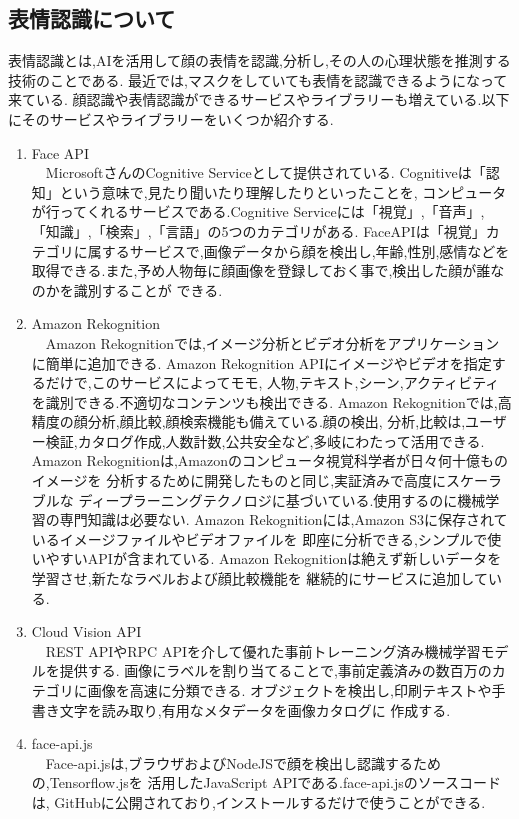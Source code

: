 \subsection{表情認識について}
表情認識とは,AIを活用して顔の表情を認識,分析し,その人の心理状態を推測する技術のことである.
最近では,マスクをしていても表情を認識できるようになって来ている.
顔認識や表情認識ができるサービスやライブラリーも増えている.以下にそのサービスやライブラリーをいくつか紹介する.

\renewcommand{\labelenumi}{(\arabic{enumi})}

\begin{enumerate}
  \item Face API \\
  　MicrosoftさんのCognitive Serviceとして提供されている.
  Cognitiveは「認知」という意味で,見たり聞いたり理解したりといったことを,
  コンピュータが行ってくれるサービスである.Cognitive Serviceには「視覚」,「音声」,
  「知識」,「検索」,「言語」の5つのカテゴリがある.
  FaceAPIは「視覚」カテゴリに属するサービスで,画像データから顔を検出し,年齢,性別,感情などを
  取得できる.また,予め人物毎に顔画像を登録しておく事で,検出した顔が誰なのかを識別することが
  できる.\\

  \item Amazon Rekognition \\
  　Amazon Rekognitionでは,イメージ分析とビデオ分析をアプリケーションに簡単に追加できる.
  Amazon Rekognition APIにイメージやビデオを指定するだけで,このサービスによってモモ,
  人物,テキスト,シーン,アクティビティを識別できる.不適切なコンテンツも検出できる.
  Amazon Rekognitionでは,高精度の顔分析,顔比較,顔検索機能も備えている.顔の検出,
  分析,比較は,ユーザー検証,カタログ作成,人数計数,公共安全など,多岐にわたって活用できる.
  Amazon Rekognitionは,Amazonのコンピュータ視覚科学者が日々何十億ものイメージを
  分析するために開発したものと同じ,実証済みで高度にスケーラブルな
  ディープラーニングテクノロジに基づいている.使用するのに機械学習の専門知識は必要ない.
  Amazon Rekognitionには,Amazon S3に保存されているイメージファイルやビデオファイルを
  即座に分析できる,シンプルで使いやすいAPIが含まれている.
  Amazon Rekognitionは絶えず新しいデータを学習させ,新たなラベルおよび顔比較機能を
  継続的にサービスに追加している.\\

  \item Cloud Vision API  \\
  　REST APIやRPC APIを介して優れた事前トレーニング済み機械学習モデルを提供する.
  画像にラベルを割り当てることで,事前定義済みの数百万のカテゴリに画像を高速に分類できる.
  オブジェクトを検出し,印刷テキストや手書き文字を読み取り,有用なメタデータを画像カタログに
  作成する.\\

  \item face-api.js \\
  　Face-api.jsは,ブラウザおよびNodeJSで顔を検出し認識するための,Tensorflow.jsを
  活用したJavaScript APIである.face-api.jsのソースコードは,
  GitHubに公開されており,インストールするだけで使うことができる.
  
\end{enumerate}


